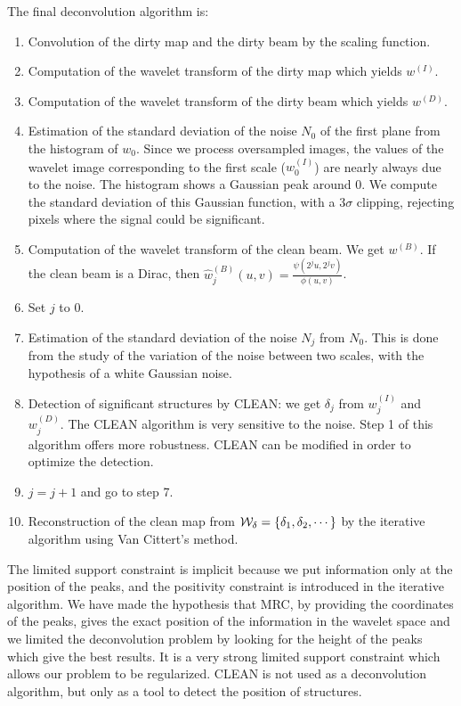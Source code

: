 \documentclass[11pt,a4paper]{article}
\begin{document}
The final deconvolution algorithm is:
\begin{enumerate}
\item Convolution of the dirty map and the dirty beam by the scaling function.
\item Computation of the wavelet transform of the dirty map which yields 
$w^{(I)}$.
\item Computation of the wavelet transform of the dirty beam which yields 
$w^{(D)}$.
\item Estimation of the standard deviation of the noise $N_0$ of the first 
plane
from the histogram of $w_0$. Since we process oversampled images, the
values of the
wavelet image corresponding to the first scale ($w_0^{(I)}$) are nearly 
always due to the noise. The histogram shows a Gaussian peak around
$0$. We compute the standard deviation of this Gaussian function,
with a $3\sigma$ clipping, rejecting pixels where the signal
could be significant.
\item Computation of the wavelet transform of the clean beam. We get $w^{(B)}$.
If the  clean beam is a Dirac, then $\hat{w}_j^{(B)}(u,v) = \frac{\psi(2^ju, 
2^jv)}{\phi(u, v)}$.
\item Set $j$ to 0. 
\item Estimation of the standard deviation of the noise $N_j$ from $N_0$. This
is done from the study of the variation of the noise between two
scales, with the hypothesis of a white Gaussian noise.
\item Detection of significant structures by CLEAN: we get $\delta_j$ from
$w_j^{(I)}$ and $w_j^{(D)}$. The CLEAN algorithm is very sensitive to the
noise. Step 1 of this algorithm offers more robustness. CLEAN
can be modified in order to optimize the detection. 
\item $j = j + 1$ and go to step 7.
\item Reconstruction of the clean map from ${\cal W}_{\delta}= \{\delta_1, \delta_2, \cdots\}$ by the 
iterative algorithm using Van Cittert's method.
\end{enumerate}

The limited support constraint is implicit because we put information
only at the position of the peaks, and the positivity constraint is 
 introduced in the iterative algorithm. 
We have made the hypothesis that MRC, 
by providing the coordinates of the peaks,
 gives the exact position of the information in the wavelet space and 
we limited the deconvolution problem by looking for the  height of the peaks 
which give the best results. It is a very strong limited support
constraint which allows our problem to be regularized. CLEAN is not used as a 
deconvolution algorithm, but only as a tool to detect the position of 
structures.
\end{document}

